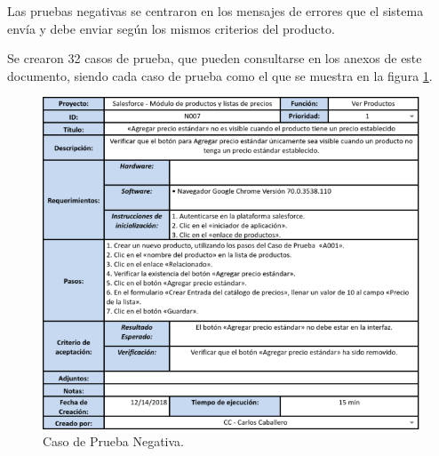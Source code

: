 Las pruebas negativas se centraron en los mensajes de errores que el sistema
envía y debe enviar según los mismos criterios del producto.

Se crearon 32 casos de prueba, que pueden consultarse en los anexos de este
documento, siendo cada caso de prueba como el que se muestra en la figura
\ref{tc_negative}.

\begin{figure}
\centering
\includegraphics[width=1.0\textwidth]{graphics/tc4-negative.eps}
\caption{Caso de Prueba Negativa.}
\label{tc_negative}
\end{figure}

